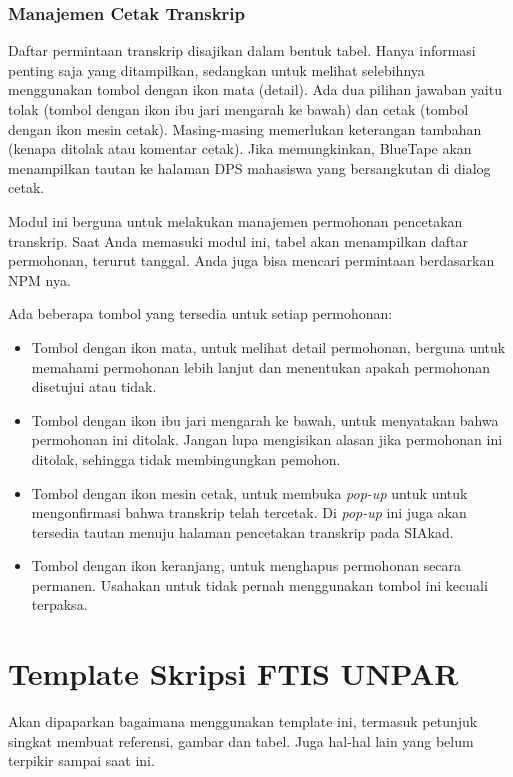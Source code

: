\subsubsection{Manajemen Cetak Transkrip}
\label{sec:bluetape_manajemen_cetak_transkrip}
Daftar permintaan transkrip disajikan dalam bentuk tabel. Hanya informasi penting saja yang ditampilkan, sedangkan untuk melihat selebihnya menggunakan tombol dengan ikon mata (detail). Ada dua pilihan jawaban yaitu tolak (tombol dengan ikon ibu jari mengarah ke bawah) dan cetak (tombol dengan ikon mesin cetak). Masing-masing memerlukan keterangan tambahan (kenapa ditolak atau komentar cetak). Jika memungkinkan, BlueTape akan menampilkan tautan ke halaman DPS mahasiswa yang bersangkutan di dialog cetak.

Modul ini berguna untuk melakukan manajemen permohonan pencetakan transkrip. Saat Anda memasuki modul ini, tabel akan menampilkan daftar permohonan, terurut tanggal. Anda juga bisa mencari permintaan berdasarkan NPM nya.

Ada beberapa tombol yang tersedia untuk setiap permohonan:
\begin{itemize}
	\item Tombol dengan ikon mata, untuk melihat detail permohonan, berguna untuk memahami permohonan lebih lanjut dan menentukan apakah permohonan disetujui atau tidak.
	\item Tombol dengan ikon ibu jari mengarah ke bawah, untuk menyatakan bahwa permohonan ini ditolak. Jangan lupa mengisikan alasan jika permohonan ini ditolak, sehingga tidak membingungkan pemohon.
	\item Tombol dengan ikon mesin cetak, untuk membuka \textit{pop-up} untuk untuk mengonfirmasi bahwa transkrip telah tercetak. Di \textit{pop-up} ini juga akan tersedia tautan menuju halaman pencetakan transkrip pada SIAkad.
	\item Tombol dengan ikon keranjang, untuk menghapus permohonan secara permanen. Usahakan untuk tidak pernah menggunakan tombol ini kecuali terpaksa.
\end{itemize}

\section{Template Skripsi FTIS UNPAR}
\label{sec:template}
 
Akan dipaparkan bagaimana menggunakan template ini, termasuk petunjuk singkat membuat referensi, gambar dan tabel.
Juga hal-hal lain yang belum terpikir sampai saat ini. 
 

